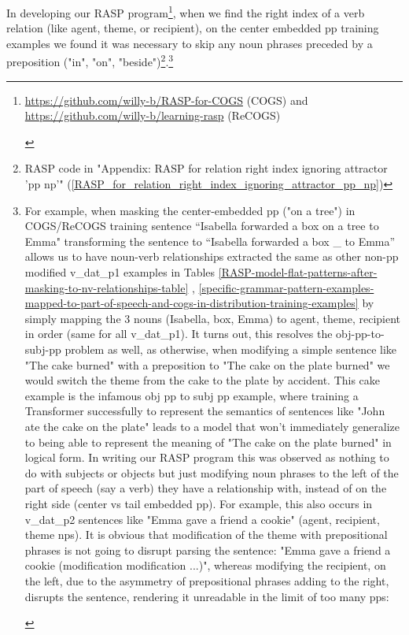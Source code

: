 \documentclass[11pt]{article}
\begin{document}
In developing our RASP program\footnote{\begin{footnotesize}\href{https://github.com/willy-b/RASP-for-COGS}{https://github.com/willy-b/RASP-for-COGS} (COGS) and \href{https://github.com/willy-b/learning-rasp}{https://github.com/willy-b/learning-rasp} (ReCOGS)\end{footnotesize}},
when we find the right index of a verb relation (like agent, theme, or recipient), 
on the center embedded pp training examples we found it was necessary to skip any noun phrases preceded by a preposition ("in", "on", "beside")\footnote{RASP code in "Appendix: RASP for relation right index ignoring attractor 'pp np'" (\ref{RASP_for_relation_right_index_ignoring_attractor_pp_np})}.\footnote{\begin{footnotesize}
For example, when masking the center-embedded pp ("on a tree") in COGS/ReCOGS training sentence “Isabella forwarded a box on a tree to Emma" transforming the sentence to “Isabella forwarded a box \_ to Emma” allows us to have noun-verb relationships extracted the same as other non-pp modified v\_dat\_p1 examples in Tables \ref{RASP-model-flat-patterns-after-masking-to-nv-relationships-table} , \ref{specific-grammar-pattern-examples-mapped-to-part-of-speech-and-cogs-in-distribution-training-examples} by simply mapping the 3 nouns (Isabella, box, Emma) to agent, theme, recipient in order (same for all v\_dat\_p1).
It turns out, this resolves the obj-pp-to-subj-pp problem as well, as otherwise, when modifying a simple sentence like "The cake burned" with a preposition to "The cake on the plate burned" we would switch the theme from the cake to the plate by accident. This cake example is the infamous obj pp to subj pp example, where training a Transformer successfully to represent the semantics of sentences like "John ate the cake on the plate" leads to a model that won't immediately generalize to being able to represent the meaning of "The cake on the plate burned" in logical form.
In writing our RASP program this was observed as nothing to do with subjects or objects but just modifying noun phrases to the left of the part of speech (say a verb) they have a relationship with, instead of on the right side (center vs tail embedded pp). For example, this also occurs in v\_dat\_p2 sentences like "Emma gave a friend a cookie" (agent, recipient, theme nps). It is obvious that modification of the theme with prepositional phrases is not going to disrupt parsing the sentence: "Emma gave a friend a cookie (modification modification ...)", whereas modifying the recipient, on the left, due to the asymmetry of prepositional phrases adding to the right, disrupts the sentence, rendering it unreadable in the limit of too many pps:


\end{footnotesize}}
\end{document}
